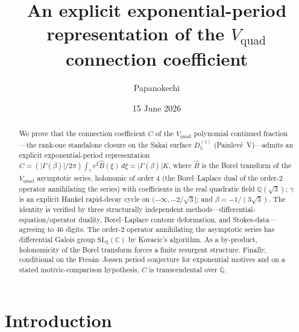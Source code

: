 \documentclass[11pt,reqno]{amsart}
\title[An exponential-period representation of the $V_{\mathrm{quad}}$ constant]%
{An explicit exponential-period representation of the $V_{\mathrm{quad}}$ connection coefficient}
\author{Papanokechi}
\date{15 June 2026}
\theoremstyle{plain}
\theoremstyle{definition}
\newcommand{\Vquad}{V_{\mathrm{quad}}}
\newcommand{\Bhat}{\widehat{B}}
\newcommand{\Qsqrt}{\mathbb{Q}(\sqrt3)}
\newcommand{\Qbar}{\overline{\mathbb{Q}}}
\newcommand{\SL}{\mathrm{SL}}
\begin{document}
\begin{abstract}
We prove that the connection coefficient $C$ of the $\Vquad$ polynomial continued fraction---the
rank-one standalone closure on the Sakai surface $D_5^{(1)}$ (Painlev\'e~V)---admits an explicit
exponential-period representation
$C=(\lvert\Gamma(\beta)\rvert/2\pi)\int_\gamma e^{\xi}\Bhat(\xi)\,d\xi=\lvert\Gamma(\beta)\rvert K$,
where $\Bhat$ is the Borel transform of the $\Vquad$ asymptotic series, holonomic of order $4$
(the Borel--Laplace dual of the order-$2$ operator annihilating the series)
with coefficients in the real quadratic field $\Qsqrt$; $\gamma$ is an explicit Hankel
rapid-decay cycle on $(-\infty,-2/\sqrt3]$; and $\beta=-1/(3\sqrt3)$. The identity is verified by
three structurally independent methods---differential-equation/operator duality, Borel--Laplace
contour deformation, and Stokes-data---agreeing to $46$ digits. The order-$2$ operator annihilating
the asymptotic series has differential Galois group $\SL_2(\mathbb{C})$ by Kovacic's algorithm.
As a by-product, holonomicity of the Borel transform forces a finite resurgent structure. Finally,
conditional on the Fres\'an--Jossen period conjecture for exponential motives and on a stated
motivic-comparison hypothesis, $C$ is transcendental over $\Qbar$.
\end{abstract}
\maketitle

\section{Introduction}\label{sec:intro}
\end{document}
